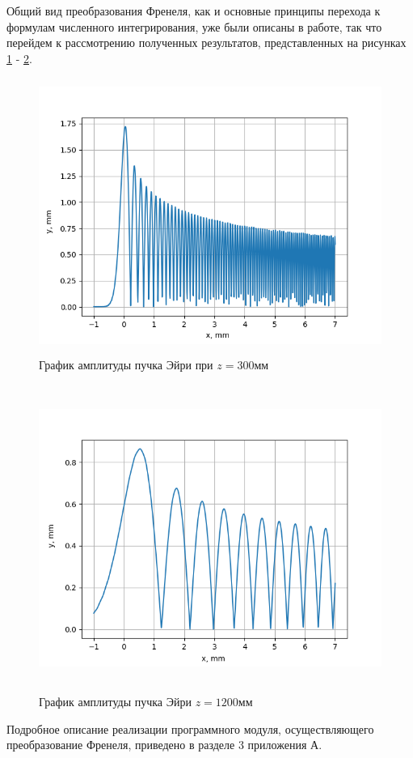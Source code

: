 {	Общий вид преобразования Френеля, как и основные принципы перехода к формулам численного интегрирования, уже были описаны в работе, так что перейдем к рассмотрению полученных результатов, представленных на рисунках \ref{fres300} - \ref{fres1200}.
	
		\begin{figure}[H]
	\centering
\includegraphics[height = 9cm]{plots/fres300.png}
\caption{График амплитуды пучка Эйри при $z = 300$мм}
	\label{fres300}
\end{figure}

\begin{figure}[H]
	\centering
\includegraphics[height = 10cm]{plots/fres1200.png}
\caption{График амплитуды пучка Эйри $z = 1200$мм}
	\label{fres1200}
\end{figure}
\vspace{0.5cm}
Подробное описание реализации программного модуля, осуществляющего преобразование Френеля, приведено в разделе 3 приложения А.

	}

